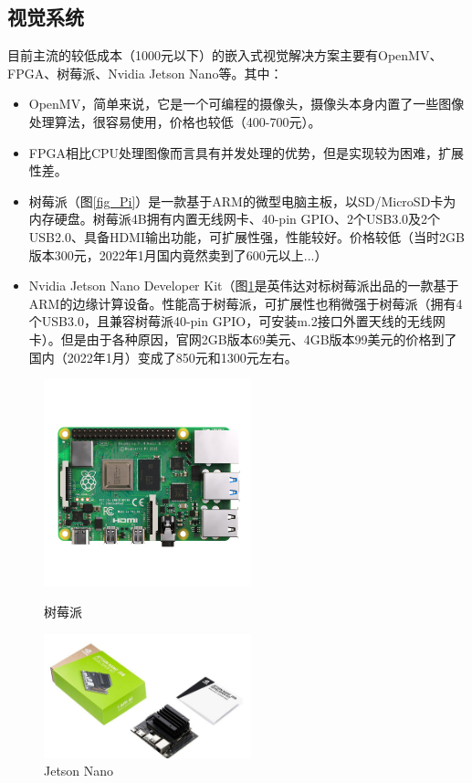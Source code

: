 \documentclass[a4paper,11pt,UTF8]{ctexart}
\begin{document}
\subsection{视觉系统}
目前主流的较低成本（1000元以下）的嵌入式视觉解决方案主要有OpenMV、FPGA、树莓派、Nvidia Jetson Nano等。其中：
\begin{itemize}
  \item OpenMV，简单来说，它是一个可编程的摄像头，摄像头本身内置了一些图像处理算法，很容易使用\cite{OpenMV}，价格也较低（400-700元）。
  \item FPGA相比CPU处理图像而言具有并发处理的优势，但是实现较为困难，扩展性差。
  \item 树莓派（图\ref{fig_Pi}）是一款基于ARM的微型电脑主板，以SD/MicroSD卡为内存硬盘。树莓派4B拥有内置无线网卡、40-pin GPIO、2个USB3.0及2个USB2.0、具备HDMI输出功能，可扩展性强，性能较好。价格较低（当时2GB版本300元，2022年1月国内竟然卖到了600元以上...）
  \item Nvidia Jetson Nano Developer Kit（图\ref{fig_Nano}是英伟达对标树莓派出品的一款基于ARM的边缘计算设备。性能高于树莓派，可扩展性也稍微强于树莓派（拥有4个USB3.0，且兼容树莓派40-pin GPIO，可安装m.2接口外置天线的无线网卡）。但是由于各种原因，官网2GB版本69美元、4GB版本99美元的价格到了国内（2022年1月）变成了850元和1300元左右。
\end{itemize}

\begin{figure}[htbp]
  \begin{center}
    \begin{minipage}[t]{0.45\linewidth}
      \centering
      \includegraphics[width=6cm]{Pi.jpg}
      \caption{树莓派} \label{fig_Pi}
    \end{minipage}%
    \begin{minipage}[t]{0.45\linewidth}
      \centering
      \includegraphics[width=6cm]{nano.jpg}
      \caption{Jetson Nano} \label{fig_Nano}
    \end{minipage}
  \end{center}
\end{figure}
\end{document}
